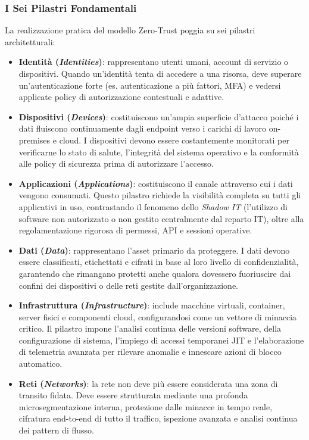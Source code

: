 \documentclass[11pt, a4paper]{article}
\begin{document}
\subsubsection{I Sei Pilastri Fondamentali}

La realizzazione pratica del modello Zero-Trust poggia su sei pilastri architetturali:
\begin{itemize}[leftmargin=*]
    \item \textbf{Identità (\emph{Identities})}: rappresentano utenti umani, account di servizio o dispositivi. Quando un'identità tenta di accedere a una risorsa, deve superare un'autenticazione forte (es. autenticazione a più fattori, MFA) e vedersi applicate policy di autorizzazione contestuali e adattive.
    \item \textbf{Dispositivi (\emph{Devices})}: costituiscono un'ampia superficie d'attacco poiché i dati fluiscono continuamente dagli endpoint verso i carichi di lavoro on-premises e cloud. I dispositivi devono essere costantemente monitorati per verificarne lo stato di salute, l'integrità del sistema operativo e la conformità alle policy di sicurezza prima di autorizzare l'accesso.
    \item \textbf{Applicazioni (\emph{Applications})}: costituiscono il canale attraverso cui i dati vengono consumati. Questo pilastro richiede la visibilità completa su tutti gli applicativi in uso, contrastando il fenomeno dello \emph{Shadow IT} (l'utilizzo di software non autorizzato o non gestito centralmente dal reparto IT), oltre alla regolamentazione rigorosa di permessi, API e sessioni operative.
    \item \textbf{Dati (\emph{Data})}: rappresentano l'asset primario da proteggere. I dati devono essere classificati, etichettati e cifrati in base al loro livello di confidenzialità, garantendo che rimangano protetti anche qualora dovessero fuoriuscire dai confini dei dispositivi o delle reti gestite dall'organizzazione.
    \item \textbf{Infrastruttura (\emph{Infrastructure})}: include macchine virtuali, container, server fisici e componenti cloud, configurandosi come un vettore di minaccia critico. Il pilastro impone l'analisi continua delle versioni software, della configurazione di sistema, l'impiego di accessi temporanei JIT e l'elaborazione di telemetria avanzata per rilevare anomalie e innescare azioni di blocco automatico.
    \item \textbf{Reti (\emph{Networks})}: la rete non deve più essere considerata una zona di transito fidata. Deve essere strutturata mediante una profonda microsegmentazione interna, protezione dalle minacce in tempo reale, cifratura end-to-end di tutto il traffico, ispezione avanzata e analisi continua dei pattern di flusso.
\end{itemize}
\end{document}

